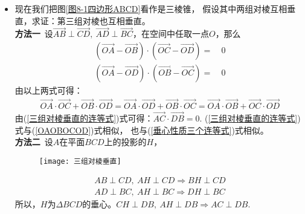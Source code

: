 \begin{itemize}[leftmargin=\inteval{\myitemleftmargin}pt,itemsep=
   \inteval{\myitemitempsep}pt,topsep=\inteval{\myitemtopsep}pt]
细心的读者应该能注意到，本题没有强调$ ABCD $是平面四边形还是空间四边形(三棱锥)，
事实上对此没有要求，不论是哪种情形，以上两种证明过程都是成立的。

\item 现在我们把图\ref{图8-1四边形ABCD}看作是三棱锥，
假设其中两组对棱互相垂直，求证：第三组对棱也互相垂直。\\
\textbf{方法一}\ 设$ \vec{AB}\perp \vec{CD},\ 
\vec{AD}\perp \vec{BC} $，在空间中任取一点$ O $，那么
\begin{align*}
    (\vec{OA}-\vec{OB})\cdot
    (\vec{OC}-\vec{OD}) =&\ 0  \\
    (\vec{OA}-\vec{OD})\cdot
    (\vec{OB}-\vec{OC}) =&\ 0 
\end{align*}
由以上两式可得：
\begin{align}\label{三组对棱垂直的连等式}
    \vec{OA}\cdot \vec{OC}+
    \vec{OB}\cdot \vec{OD}=
    \vec{OA}\cdot \vec{OD}+
    \vec{OB}\cdot \vec{OC}=
    \vec{OA}\cdot \vec{OB}+
    \vec{OC}\cdot \vec{OD}
\end{align}
由(\ref{三组对棱垂直的连等式})式可得：$ \vec{AC}\cdot
\vec{DB}=0 $. (\ref{三组对棱垂直的连等式})式与(\ref{OAOBOCOD})式相似，
也与(\ref{垂心性质三个连等式})式相似。\\
\textbf{方法二}\ 设$ A $在平面$ BCD $上的投影的$ H $，
\begin{figure}[h]
    \centering
    \texttt{[image: 三组对棱垂直]}
\end{figure}
\begin{align*}
    AB\perp CD,\ AH\perp CD \Rightarrow BH\perp CD \\
    AD\perp BC,\ AH\perp BC \Rightarrow DH\perp BC 
\end{align*}
所以，$ H $为$ \Delta BCD $的垂心。$ CH\perp DB,\ AH\perp DB \Rightarrow 
AC\perp DB $. 


\end{itemize}
